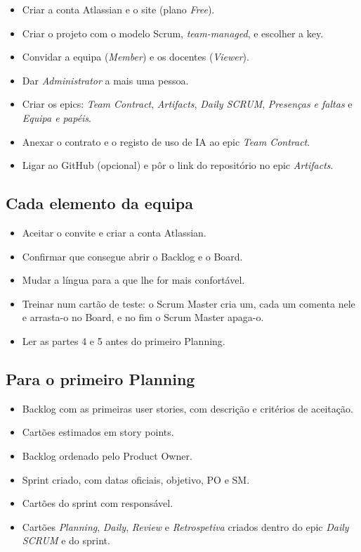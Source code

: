 \documentclass[11pt,a4paper]{article}
\begin{document}
\begin{itemize}[label=\textcolor{azul}{$\square$}]
  \item Criar a conta Atlassian e o site (plano \textit{Free}).
  \item Criar o projeto com o modelo Scrum, \textit{team-managed}, e escolher a key.
  \item Convidar a equipa (\textit{Member}) e os docentes (\textit{Viewer}).
  \item Dar \textit{Administrator} a mais uma pessoa.
  \item Criar os epics: \textit{Team Contract}, \textit{Artifacts}, \textit{Daily SCRUM}, \textit{Presenças e faltas} e \textit{Equipa e papéis}.
  \item Anexar o contrato e o registo de uso de IA ao epic \textit{Team Contract}.
  \item Ligar ao GitHub (opcional) e pôr o link do repositório no epic \textit{Artifacts}.
\end{itemize}

\subsection{Cada elemento da equipa}

\begin{itemize}[label=\textcolor{azul}{$\square$}]
  \item Aceitar o convite e criar a conta Atlassian.
  \item Confirmar que consegue abrir o Backlog e o Board.
  \item Mudar a língua para a que lhe for mais confortável.
  \item Treinar num cartão de teste: o Scrum Master cria um, cada um comenta nele e arrasta-o no Board, e no fim o Scrum Master apaga-o.
  \item Ler as partes 4 e 5 antes do primeiro Planning.
\end{itemize}

\subsection{Para o primeiro Planning}

\begin{itemize}[label=\textcolor{azul}{$\square$}]
  \item Backlog com as primeiras user stories, com descrição e critérios de aceitação.
  \item Cartões estimados em story points.
  \item Backlog ordenado pelo Product Owner.
  \item Sprint criado, com datas oficiais, objetivo, PO e SM.
  \item Cartões do sprint com responsável.
  \item Cartões \textit{Planning}, \textit{Daily}, \textit{Review} e \textit{Retrospetiva} criados dentro do epic \textit{Daily SCRUM} e do sprint.
\end{itemize}
\end{document}
